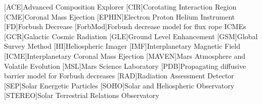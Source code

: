 	\begin{acronym}
	[ACE]{Advanced Composition Explorer}
	[CIR]{Corotating Interaction Region}
	[CME]{Coronal Mass Ejection}
	[EPHIN]{Electron Proton Helium Instrument}
	[FD]{Forbush Decrease}
	[ForbMod]{Forbush decrease model for flux rope ICMEs \cite{Dumbovic2018-ForbMod}}
	[GCR]{Galactic Cosmic Radiation}
	[GLE]{Ground Level Enhancement}
	[GSM]{Global Survey Method \cite{Belov-2005-GSM}}
	[HI]{Heliospheric Imager}
	[IMF]{Interplanetary Magnetic Field}
	[ICME]{Interplanetary Coronal Mass Ejection}
	[MAVEN]{Mars Atmosphere and Volatile Evolution}
	[MSL]{Mars Science Laboratory}
	[PDB]{Propagating diffusive barrier model for Forbush decreases \cite{Wibberenz-1998}}
	[RAD]{Radiation Assessment Detector}
	[SEP]{Solar Energetic Particles}
	[SOHO]{Solar and Heliospheric Observatory}
	[STEREO]{Solar Terrestrial Relations Observatory}
	\end{acronym}
	

\endgroup

\cleardoublepage